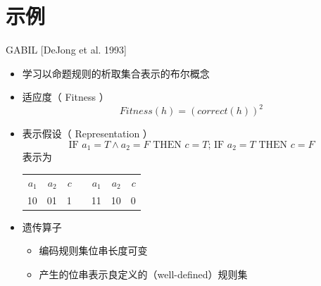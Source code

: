 \documentclass[presentation]{beamer}
\begin{document}
\section{示例}
\label{sec:org4c21d1e}
\begin{frame}[label={sec:orgeb626a2}]{GABIL [DeJong et al. 1993]}
\begin{itemize}
\item 学习以命题规则的析取集合表示的布尔概念
\item 适应度（ \alert{Fitness} ）
\[ Fitness(h) = (correct(h))^2 \]
\item 表示假设（ \alert{Representation} ）
\[\mbox{IF  } a_{1} = T \land a_{2}=F \mbox{\ THEN\ } c = T 
   \mbox{; \ IF  } a_{2} = T  \mbox{\  THEN\  } c = F  \]
 表示为
\begin{center}
\begin{tabular}{rrrlrrr}
\(a_{1}\) & \(a_{2}\) & \(c\) &  & \(a_{1}\) & \(a_{2}\) & \(c\)\\
10 & 01 & 1 &  & 11 & 10 & 0\\
\end{tabular}
\end{center}
\item 遗传算子
\begin{itemize}
\item 编码规则集位串长度可变
\item 产生的位串表示良定义的（well-defined）规则集
\end{itemize}
\end{itemize}
\end{frame}
\end{document}
